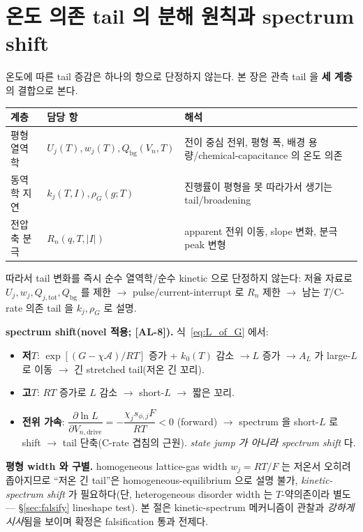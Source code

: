 \documentclass[11pt,a4paper]{article}
\newcommand{\drive}{\mathrm{drive}}
\newcommand{\tot}{\mathrm{tot}}
\newcommand{\bg}{\mathrm{bg}}
\newcommand{\AL}[1]{\textsf{[AL-#1]}}
\begin{document}
\section{온도 의존 tail 의 분해 원칙과 spectrum shift}\label{sec:tailT}
온도에 따른 tail 증감은 하나의 항으로 단정하지 않는다. 본 장은 관측 tail 을 \textbf{세 계층}의 결합으로 본다.
\begin{longtable}{p{} p{} p{}}
\toprule 계층 & 담당 항 & 해석 \\ \midrule \endhead
평형 열역학 & $U_j(T),w_j(T),Q_\bg(V_n,T)$ & 전이 중심 전위, 평형 폭, 배경 용량/chemical-capacitance 의 온도 의존 \\
동역학 지연 & $k_j(T,I),\rho_G(g;T)$ & 진행률이 평형을 못 따라가서 생기는 tail/broadening \\
전압축 분극 & $R_n(q,T,|I|)$ & apparent 전위 이동, slope 변화, 분극 peak 변형 \\
\bottomrule
\end{longtable}
따라서 tail 변화를 즉시 순수 열역학/순수 kinetic 으로 단정하지 않는다: 저율 자료로 $U_j,w_j,Q_{j,\tot},Q_\bg$
를 제한 $\to$ pulse/current-interrupt 로 $R_n$ 제한 $\to$ 남는 $T$/C-rate 의존 tail 을 $k_j,\rho_G$ 로 설명.

\textbf{spectrum shift(novel 적용; \AL{8}).} 식~\eqref{eq:L_of_G} 에서:
\begin{itemize}[leftmargin=1.4em]
\item \textbf{저$T$}: $\exp[(G-\chi\mathcal A)/RT]$ 증가 + $k_0(T)$ 감소 $\to L$ 증가 $\to A_L$ 가 large-$L$
  로 이동 $\to$ 긴 stretched tail(저온 긴 꼬리).
\item \textbf{고$T$}: $RT$ 증가로 $L$ 감소 $\to$ short-$L$ $\to$ 짧은 꼬리.
\item \textbf{전위 가속}: $\dfrac{\partial\ln L}{\partial V_{n,\drive}}=-\dfrac{\chi_j s_{\phi,j}F}{RT}<0$
  (forward) $\to$ spectrum 을 short-$L$ 로 shift $\to$ tail 단축(C-rate 겹침의 근원). \emph{state jump 가
  아니라 spectrum shift} 다.
\end{itemize}
\textbf{평형 width 와 구별.} homogeneous lattice-gas width $w_j=RT/F$ 는 저온서 오히려 좁아지므로 ``저온
긴 tail''은 homogeneous-equilibrium 으로 설명 불가, \emph{kinetic-spectrum shift} 가 필요하다(단,
heterogeneous disorder width 는 $T$-약의존이라 별도 — \S\ref{sec:falsify} lineshape test). 본 절은
kinetic-spectrum 메커니즘이 관찰과 \emph{강하게 시사}됨을 보이며 확정은 falsification 통과 전제다.

\end{document}
